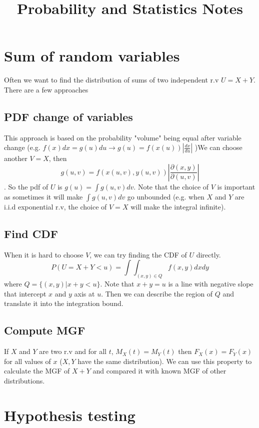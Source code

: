 \documentclass[12pt]{article}
\title{Probability and Statistics Notes}
\begin{document}
	\maketitle
\section{Sum of random variables}
Often we want to find the distribution of sums of two independent r.v $U = X + Y$. There are a few approaches 
\subsection{PDF change of variables}
This approach is based on the probability "volume" being equal after variable change (e.g. $f(x)dx = g(u)du \rightarrow g(u) = f(x(u)) \left| \frac{dx}{du}\right|$ )We can choose another $V=X$,  then $$g(u, v) = f(x(u, v), y(u, v)) \left| \frac{\partial(x, y)}{\partial(u, v)} \right|$$. So the pdf of $U$ is $g(u) = \int g(u, v) dv$. Note that the choice of $V$ is important as sometimes it will make $\int g(u, v) dv$ go unbounded (e.g. when $X$ and $Y$ are i.i.d exponential r.v, the choice of $V = X$ will make the integral infinite).

\subsection{Find CDF}
When it is hard to choose $V$, we can try finding the CDF of $U$ directly. $$P(U=X+Y < u) = \int\int_{(x,y) \in Q} f(x, y) dxdy $$
where $Q=\{(x, y) | x + y < u \}$. Note that $x + y = u$ is a line with negative slope that intercept $x$ and $y$ axis at $u$. Then we can describe the region of $Q$ and translate it into the integration bound. 

\subsection{Compute MGF}
If $X$ and $Y$ are two r.v and for all $t$, $M_X(t) = M_Y(t)$ then $F_X(x) = F_Y(x)$ for all values of $x$ ($X,Y$ have the same distribution). We can use this property to calculate the MGF of $X+Y$ and compared it with known MGF of other distributions. \textbf{}

\section{Hypothesis testing}
\end{document}

